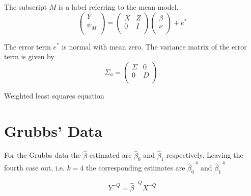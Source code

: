 \documentclass[12pt, a4paper]{article}
\begin{document}

The subscript $M$ is a label referring to the mean model.
\begin{equation}
\left(%
\begin{array}{c}
Y \\
\psi_{M} \\
\end{array}%
\right) = \left(
\begin{array}{cc}
X & Z \\
0 & I \\
\end{array}\right) \left(%
\begin{array}{c}
\beta \\
\nu \\
\end{array}%
\right)+ e^{*}
\end{equation}




The error term $e^{*}$ is normal with mean zero. The variance matrix of the error term is given by
\begin{equation}
\Sigma_{a} = \left(%
\begin{array}{cc}
\Sigma & 0 \\
0 & D \\
\end{array}%
\right).
\end{equation}



Weighted least squares equation








\section{Grubbs' Data} %

For the Grubbs data the $\hat{\beta}$ estimated are
$\hat{\beta}_{0}$ and $\hat{\beta}_{1}$ respectively. Leaving the
fourth case out, i.e. $k=4$ the corresponding estimates are
$\hat{\beta}_{0}^{-4}$ and $\hat{\beta}_{1}^{-4}$


\begin{equation}
Y^{-Q} = \hat{\beta}^{-Q}X^{-Q}
\end{equation}
\end{document}

